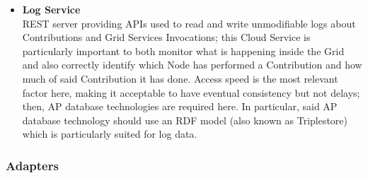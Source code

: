 \begin{itemize}
    \item \textbf{Log Service}\\
    REST server providing APIs used to read and write unmodifiable logs about Contributions and Grid Services Invocations; this Cloud Service is particularly important to both monitor what is happening inside the Grid and also correctly identify which Node has performed a Contribution and how much of said Contribution it has done. Access speed is the most relevant factor here, making it acceptable to have eventual consistency but not delays; then, AP database technologies are required here. In particular, said AP database technology should use an RDF model (also known as Triplestore) which is particularly suited for log data.
\end{itemize}

\subsubsection{Adapters}
